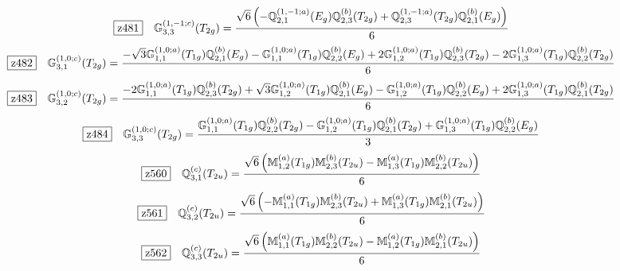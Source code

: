 \documentclass[fleqn,10pt,landscape]{jsarticle}
\begin{document}
\begin{dmath*}
\hspace*{3mm}\fbox{z481}\quad \mathbb{G}_{3,3}^{(1,-1;c)}(T_{2g})=\frac{\sqrt{6} \left(- \mathbb{Q}_{2,1}^{(1,-1;a)}(E_{g}) \mathbb{Q}_{2,3}^{(b)}(T_{2g}) + \mathbb{Q}_{2,3}^{(1,-1;a)}(T_{2g}) \mathbb{Q}_{2,1}^{(b)}(E_{g})\right)}{6}
\end{dmath*}
\begin{dmath*}
\hspace*{3mm}\fbox{z482}\quad \mathbb{G}_{3,1}^{(1,0;c)}(T_{2g})=\frac{- \sqrt{3} \mathbb{G}_{1,1}^{(1,0;a)}(T_{1g}) \mathbb{Q}_{2,1}^{(b)}(E_{g}) - \mathbb{G}_{1,1}^{(1,0;a)}(T_{1g}) \mathbb{Q}_{2,2}^{(b)}(E_{g}) + 2 \mathbb{G}_{1,2}^{(1,0;a)}(T_{1g}) \mathbb{Q}_{2,3}^{(b)}(T_{2g}) - 2 \mathbb{G}_{1,3}^{(1,0;a)}(T_{1g}) \mathbb{Q}_{2,2}^{(b)}(T_{2g})}{6}
\end{dmath*}
\begin{dmath*}
\hspace*{3mm}\fbox{z483}\quad \mathbb{G}_{3,2}^{(1,0;c)}(T_{2g})=\frac{- 2 \mathbb{G}_{1,1}^{(1,0;a)}(T_{1g}) \mathbb{Q}_{2,3}^{(b)}(T_{2g}) + \sqrt{3} \mathbb{G}_{1,2}^{(1,0;a)}(T_{1g}) \mathbb{Q}_{2,1}^{(b)}(E_{g}) - \mathbb{G}_{1,2}^{(1,0;a)}(T_{1g}) \mathbb{Q}_{2,2}^{(b)}(E_{g}) + 2 \mathbb{G}_{1,3}^{(1,0;a)}(T_{1g}) \mathbb{Q}_{2,1}^{(b)}(T_{2g})}{6}
\end{dmath*}
\begin{dmath*}
\hspace*{3mm}\fbox{z484}\quad \mathbb{G}_{3,3}^{(1,0;c)}(T_{2g})=\frac{\mathbb{G}_{1,1}^{(1,0;a)}(T_{1g}) \mathbb{Q}_{2,2}^{(b)}(T_{2g}) - \mathbb{G}_{1,2}^{(1,0;a)}(T_{1g}) \mathbb{Q}_{2,1}^{(b)}(T_{2g}) + \mathbb{G}_{1,3}^{(1,0;a)}(T_{1g}) \mathbb{Q}_{2,2}^{(b)}(E_{g})}{3}
\end{dmath*}
\begin{dmath*}
\hspace*{3mm}\fbox{z560}\quad \mathbb{Q}_{3,1}^{(c)}(T_{2u})=\frac{\sqrt{6} \left(\mathbb{M}_{1,2}^{(a)}(T_{1g}) \mathbb{M}_{2,3}^{(b)}(T_{2u}) - \mathbb{M}_{1,3}^{(a)}(T_{1g}) \mathbb{M}_{2,2}^{(b)}(T_{2u})\right)}{6}
\end{dmath*}
\begin{dmath*}
\hspace*{3mm}\fbox{z561}\quad \mathbb{Q}_{3,2}^{(c)}(T_{2u})=\frac{\sqrt{6} \left(- \mathbb{M}_{1,1}^{(a)}(T_{1g}) \mathbb{M}_{2,3}^{(b)}(T_{2u}) + \mathbb{M}_{1,3}^{(a)}(T_{1g}) \mathbb{M}_{2,1}^{(b)}(T_{2u})\right)}{6}
\end{dmath*}
\begin{dmath*}
\hspace*{3mm}\fbox{z562}\quad \mathbb{Q}_{3,3}^{(c)}(T_{2u})=\frac{\sqrt{6} \left(\mathbb{M}_{1,1}^{(a)}(T_{1g}) \mathbb{M}_{2,2}^{(b)}(T_{2u}) - \mathbb{M}_{1,2}^{(a)}(T_{1g}) \mathbb{M}_{2,1}^{(b)}(T_{2u})\right)}{6}
\end{dmath*}
\end{document}
